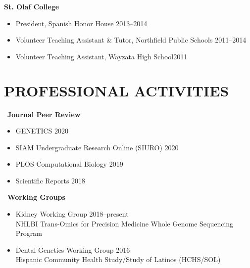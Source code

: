 \documentclass[margin]{res}
\begin{document}
\begin{resume}
			\textbf{St. Olaf College}
			\begin{itemize} \itemsep -2pt
			\item President, Spanish Honor House \hfill 2013--2014
			\item Volunteer Teaching Assistant \& Tutor, Northfield Public Schools \hfill 2011--2014
			\item Volunteer Teaching Assistant, Wayzata High School\hfill 2011 \\
			\end{itemize}
						
\section{PROFESSIONAL ACTIVITIES} 
	\ \textbf{Journal Peer Review} 
	\begin{itemize} \itemsep -2pt 
	\item GENETICS \hfill 2020
	\item SIAM Undergraduate Research Online (SIURO) \hfill 2020
	\item PLOS Computational Biology \hfill 2019
	\item Scientific Reports \hfill 2018
	\end{itemize} \pagebreak
	
	\ \textbf{Working Groups} 
	\begin{itemize} \itemsep -2pt
	\item Kidney Working Group \hfill 2018--present \\ NHLBI Trans-Omics for Precision Medicine Whole Genome Sequencing Program 
	\item Dental Genetics Working Group \hfill 2016 \\ Hispanic Community Health Study/Study of Latinos (HCHS/SOL)
	\end{itemize}
	

\end{resume}
\end{document}

